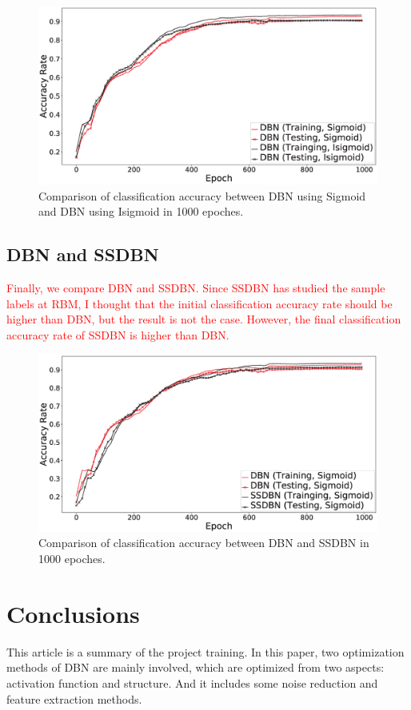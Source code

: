 \documentclass{modified}
\begin{document}
\begin{figure}[htbp]
	\centering
	\includegraphics[width=\columnwidth]{SigmoidVSIsigmoid.eps}
	\caption{Comparison of classification accuracy between DBN using Sigmoid and DBN using Isigmoid in 1000 epoches.}
	\label{fig:SigmoidVSIsigmoid}
\end{figure}

\subsection{DBN and SSDBN}
\textcolor{red}{Finally, we compare DBN and SSDBN. Since SSDBN has studied the sample labels at RBM, I thought that the initial classification accuracy rate should be higher than DBN, but the result is not the case. However, the final classification accuracy rate of SSDBN is higher than DBN.}

\begin{figure}[htbp]
	\centering
	\includegraphics[width=\columnwidth]{SSDBN.eps}
	\caption{Comparison of classification accuracy between DBN and SSDBN in 1000 epoches.}
	\label{fig:SSDBN}
\end{figure}

\section{Conclusions}
This article is a summary of the project training. In this paper, two optimization methods of DBN are mainly involved, which are optimized from two aspects: activation function and structure. And it includes some noise reduction and feature extraction methods.
\end{document}
